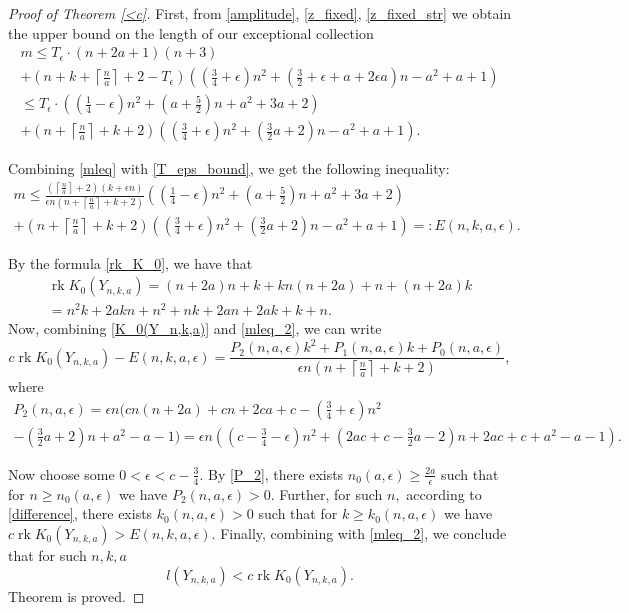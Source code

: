 \documentclass[11pt,leqno]{amsart}
\numberwithin{equation}{section}
\newcommand{\rk}{\operatorname{rk}}
\begin{document}
\begin{proof}[Proof of Theorem \ref{<c}]
First, from \eqref{amplitude}, \eqref{z_fixed}, \eqref{z_fixed_str} we obtain the upper bound on the length of our exceptional collection
\begin{multline}\label{mleq}m\leq T_{\epsilon}\cdot \left(n+2a+1\right)\left(n+3\right)\\
+\left(n+k+\left\lceil\frac{n}a\right\rceil+2-T_{\epsilon}\right)
\left(\left(\frac34+\epsilon\right)n^2+\left(\frac32+\epsilon+a+2\epsilon a\right)n-a^2+a+1\right)\\
\leq T_{\epsilon}\cdot \left(\left(\frac14-\epsilon\right)n^2+\left(a+\frac52\right)n+a^2+3a+2\right)\\+
\left(n+\left\lceil\frac{n}a\right\rceil+k+2\right)\left(\left(\frac34+\epsilon\right)n^2+\left(\frac32 a+2\right)n-a^2+a+1\right).\end{multline}

Combining \eqref{mleq} with \eqref{T_eps_bound}, we get the following inequality:
\begin{multline}\label{mleq_2}m\leq \frac{(\left\lceil\frac{n}a\right\rceil+2)(k+\epsilon n)}{\epsilon n(n+\left\lceil\frac{n}a\right\rceil+k+2)}\left(\left(\frac14-\epsilon\right)n^2+\left(a+\frac52\right)n+a^2+3a+2\right)\\
+\left(n+\left\lceil\frac{n}a\right\rceil+k+2\right)\left(\left(\frac34+\epsilon\right)n^2+\left(\frac32 a+2\right)n-a^2+a+1\right)=:E(n,k,a,\epsilon).\end{multline}

By the formula \eqref{rk_K_0},
we have that
\begin{multline}\label{K_0(Y_n,k,a)}\rk K_0(Y_{n,k,a})=(n+2a)n+k+kn(n+2a)+n+(n+2a)k\\
=n^2k+2akn+n^2+nk+2an+2ak+k+n.\end{multline}
Now, combining \eqref{K_0(Y_n,k,a)} and \eqref{mleq_2}, we can write
\begin{equation}\label{difference}c\rk K_0(Y_{n,k,a})-E(n,k,a,\epsilon)=\frac{P_2(n,a,\epsilon)k^2+P_1(n,a,\epsilon)k+P_0(n,a,\epsilon)}{\epsilon n(n+\left\lceil\frac{n}a\right\rceil+k+2)},\end{equation}
where
\begin{multline}\label{P_2}P_2(n,a,\epsilon)=\epsilon n(cn(n+2a)+cn+2ca+c-\left(\frac34+\epsilon\right)n^2\\
-\left(\frac32 a+2\right)n+a^2-a-1)
=\epsilon n((c-\frac34-\epsilon) n^2+(2ac+c-\frac32 a-2)n+2ac+c+a^2-a-1).\end{multline}

Now choose some $0<\epsilon<c-\frac34.$ By \eqref{P_2}, there exists $n_0(a,\epsilon)\geq \frac{2a}{\epsilon}$ such that for $n\geq n_0(a,\epsilon)$ we have $P_2(n,a,\epsilon)>0.$
Further, for such $n,$ according to \eqref{difference}, there exists $k_0(n,a,\epsilon)>0$ such that for $k\geq k_0(n,a,\epsilon)$
we have $c\rk K_0(Y_{n,k,a})>E(n,k,a,\epsilon).$ Finally, combining with \eqref{mleq_2}, we conclude that for such $n,k,a$
$$l(Y_{n,k,a})<c\rk K_0(Y_{n,k,a}).$$
Theorem is proved.
\end{proof}
\end{document}

